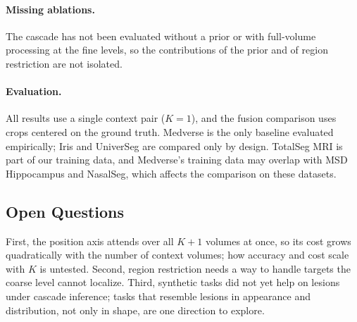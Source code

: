 \paragraph{Missing ablations.}
The cascade has not been evaluated without a prior or with full-volume
processing at the fine levels, so the contributions of the prior and of region
restriction are not isolated.

\paragraph{Evaluation.}
All results use a single context pair ($K = 1$), and the fusion comparison
uses crops centered on the ground truth. Medverse is the only baseline
evaluated empirically; Iris and UniverSeg are compared only by design.
TotalSeg MRI is part of our training data, and Medverse's training data may
overlap with MSD Hippocampus and NasalSeg, which affects the comparison on
these datasets.

\subsection{Open Questions}\label{sec:discussion-open}

First, the position axis attends over all $K+1$ volumes at once, so its cost
grows quadratically with the number of context volumes; how accuracy and cost
scale with $K$ is untested. Second, region restriction needs a way to handle
targets the coarse level cannot localize. Third, synthetic tasks did not yet
help on lesions under cascade inference; tasks that resemble lesions in
appearance and distribution, not only in shape, are one direction to explore.